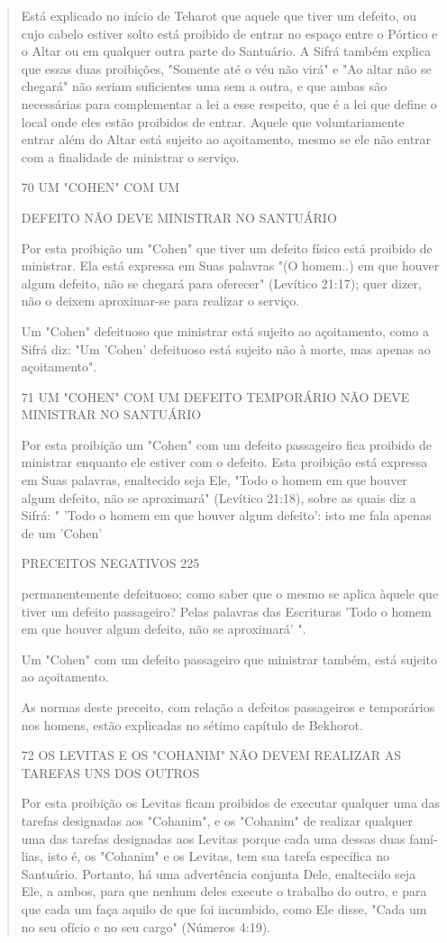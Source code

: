 \begin{quote}
Está explicado no início de Teharot que aquele que tiver um defei­to, ou
cujo cabelo estiver solto está proibido de entrar no espaço entre o
Pórti­co e o Altar ou em qualquer outra parte do Santuário. A Sifrá
também explica que essas duas proibições, "Somente até o véu não virá" e
"Ao altar não se chegará" não seriam suficientes uma sem a outra, e que
ambas são necessárias para complementar a lei a esse respeito, que é a
lei que define o local onde eles estão proibidos de entrar. Aquele que
voluntariamente entrar além do Altar es­tá sujeito ao açoitamento, mesmo
se ele não entrar com a finalidade de minis­trar o serviço.

70 UM "COHEN" COM UM

DEFEITO NÃO DEVE MINISTRAR NO SANTUÁRIO

Por esta proibição um "Cohen" que tiver um defeito físico está proi­bido
de ministrar. Ela está expressa em Suas palavras "(O homem..) em que
hou­ver algum defeito, não se chegará para oferecer" (Levítico 21:17);
quer dizer, não o deixem aproximar-se para realizar o serviço.

Um "Cohen" defeituoso que ministrar está sujeito ao açoitamento, como a
Sifrá diz: "Um 'Cohen' defeituoso está sujeito não à morte, mas apenas
ao açoitamento".

71 UM "COHEN" COM UM DEFEITO TEMPORÁRIO NÃO DEVE MINISTRAR NO SANTUÁRIO

Por esta proibição um "Cohen" com um defeito passageiro fica proi­bido
de ministrar enquanto ele estiver com o defeito. Esta proibição está
expressa em Suas palavras, enaltecido seja Ele, "Todo o homem em que
houver algum defeito, não se aproximará" (Levítico 21:18), sobre as
quais diz a Sifrá: " 'Todo o homem em que houver algum defeito': isto me
fala apenas de um 'Cohen'

PRECEITOS NEGATIVOS 225

permanentemente defeituoso; como saber que o mesmo se aplica àquele que
tiver um defeito passageiro? Pelas palavras das Escrituras 'Todo o homem
em que houver algum defeito, não se aproximará' ".

Um "Cohen" com um defeito passageiro que ministrar também, es­tá sujeito
ao açoitamento.

As normas deste preceito, com relação a defeitos passageiros e
tem­porários nos homens, estão explicadas no sétimo capítulo de
Bekhorot.

72 OS LEVITAS E OS "COHANIM" NÃO DEVEM REALIZAR AS TAREFAS UNS DOS
OUTROS

Por esta proibição os Levitas ficam proibidos de executar qualquer uma
das tarefas designadas aos "Cohanim", e os "Cohanim" de realizar
qual­quer uma das tarefas designadas aos Levitas porque cada uma dessas
duas famí­lias, isto é, os "Cohanim" e os Levitas, tem sua tarefa
específica no Santuário. Portanto, há uma advertência conjunta Dele,
enaltecido seja Ele, a ambos, para que nenhum deles execute o trabalho
do outro, e para que cada um faça aquilo de que foi incumbido, como Ele
disse, "Cada um no seu ofício e no seu cargo" (Números 4:19).


\end{quote}
